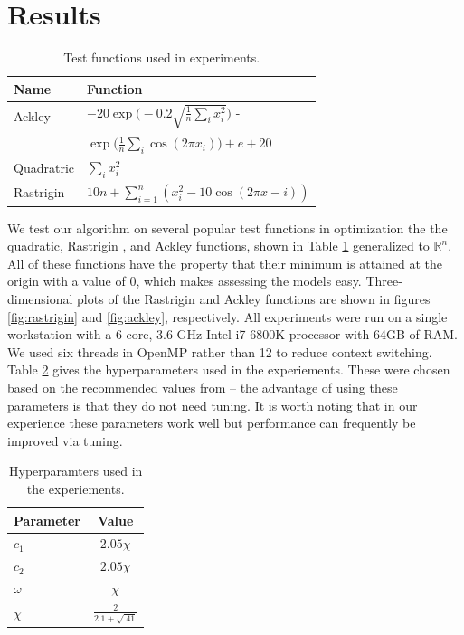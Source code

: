 \section{Results}\label{sec:results}
\begin{table}
  \centering
  \caption{Test functions used in experiments.}\label{tab:functions}
  \begin{tabular}{ll}\toprule
    \textbf{Name} & \textbf{Function}\\\midrule
    Ackley & $-20\exp\Big(-0.2\sqrt{\frac{1}{n}\sum_ix_i^2}\Big)$ -\\
    & \hspace{5mm} $\exp\Big(\frac{1}{n}\sum_i\cos(2\pi x_i)\Big) + e + 20$\\
    Quadratric & $\sum_i x_i^2$\\
    Rastrigin & $10n + \sum_{i=1}^n(x_i^2 - 10\cos(2\pi x - i))$\\\bottomrule
  \end{tabular}
\end{table}
We test our algorithm on several popular test functions in optimization
\cite{testprobs} the the quadratic, Rastrigin
\cite{rastrigin}, and Ackley \cite{ackley} functions, shown in Table
\ref{tab:functions} generalized to $\mathbb{R}^n$. All of these functions have
the property that their minimum is attained at the origin with a value of
$0$, which makes assessing the models easy. Three-dimensional plots of the
Rastrigin and Ackley functions are shown in figures \ref{fig:rastrigin} and
\ref{fig:ackley}, respectively.
All experiments were run on a single
workstation with a 6-core, 3.6 GHz Intel i7-6800K processor with 64GB of RAM. We
used six threads in OpenMP rather than 12 to reduce context switching.
Table \ref{tab:param}
gives the hyperparameters used in the experiements. These were chosen based on
the recommended values from \cite{pso-convergence, spso} -- the advantage of
using these parameters is that they do not need tuning. It is
worth noting that in our experience these parameters work well but performance
can frequently be improved via tuning.

\begin{table}
  \centering
  \caption{Hyperparamters used in the experiements.}\label{tab:param}
  \begin{tabular}{lc}\toprule
    \textbf{Parameter} & \textbf{Value}\\\midrule
    $c_1$ & $2.05 \chi$\\
    $c_2$ & $2.05 \chi$\\
    $\omega$ & $\chi$\\
    $\chi$ & $\frac{2}{2.1 + \sqrt{.41}}$\\\bottomrule
    \end{tabular}
\end{table}


